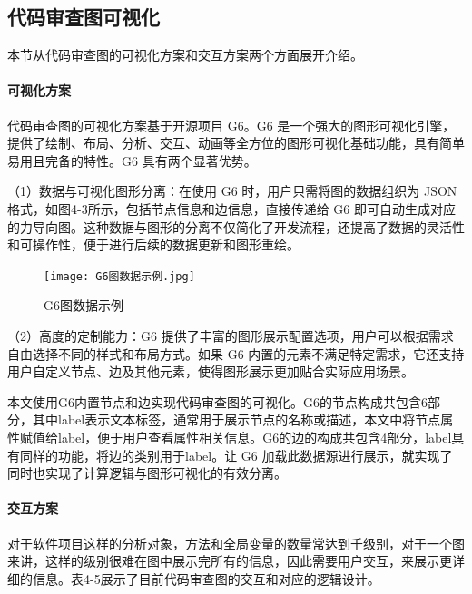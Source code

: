 \subsection{代码审查图可视化}

本节从代码审查图的可视化方案和交互方案两个方面展开介绍。

\paragraph{可视化方案}

代码审查图的可视化方案基于开源项目 G6。G6 是一个强大的图形可视化引擎，提供了绘制、布局、分析、交互、动画等全方位的图形可视化基础功能，具有简单易用且完备的特性。G6 具有两个显著优势。

（1）数据与可视化图形分离：在使用 G6 时，用户只需将图的数据组织为 JSON 格式，如图4-3所示，包括节点信息和边信息，直接传递给 G6 即可自动生成对应的力导向图。这种数据与图形的分离不仅简化了开发流程，还提高了数据的灵活性和可操作性，便于进行后续的数据更新和图形重绘。

\begin{figure}[h]
\centering
\texttt{[image: G6图数据示例.jpg]}
\caption{G6图数据示例}
\end{figure}

（2）高度的定制能力：G6 提供了丰富的图形展示配置选项，用户可以根据需求自由选择不同的样式和布局方式。如果 G6 内置的元素不满足特定需求，它还支持用户自定义节点、边及其他元素，使得图形展示更加贴合实际应用场景。

本文使用G6内置节点和边实现代码审查图的可视化。G6的节点构成共包含6部分，其中label表示文本标签，通常用于展示节点的名称或描述，本文中将节点属性赋值给label，便于用户查看属性相关信息。G6的边的构成共包含4部分，label具有同样的功能，将边的类别用于label。让 G6 加载此数据源进行展示，就实现了同时也实现了计算逻辑与图形可视化的有效分离。


\paragraph{交互方案}

对于软件项目这样的分析对象，方法和全局变量的数量常达到千级别，对于一个图来讲，这样的级别很难在图中展示完所有的信息，因此需要用户交互，来展示更详细的信息。表4-5展示了目前代码审查图的交互和对应的逻辑设计。


